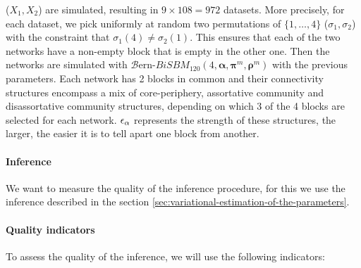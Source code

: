 (\(X_1, X_2\)) are simulated, resulting in \(9 \times 108 = 972\)
datasets. More precisely, for each dataset, we pick uniformly at random
two permutations of \(\{ 1, \dots , 4 \}\) (\(\sigma_1, \sigma_2\)) with
the constraint that \(\sigma_1(4) \neq \sigma_2(1)\). This ensures that
each of the two networks have a non-empty block that is empty in the
other one. Then the networks are simulated with
\(\mathcal{B}\)ern-\(BiSBM_{120}(4, \bm{\alpha}, \bm{\pi}^m, \bm{\rho}^m)\)
with the previous parameters. Each network has 2 blocks in common and
their connectivity structures encompass a mix of core-periphery,
assortative community and disassortative community structures, depending
on which 3 of the 4 blocks are selected for each network.
\(\eps[\alpha]\) represents the strength of these structures, the
larger, the easier it is to tell apart one block from another.

\paragraph{Inference}

We want to measure the quality of the inference procedure, for this we
use the inference described in the section
\ref{sec:variational-estimation-of-the-parameters}.

\paragraph{Quality indicators}

To assess the quality of the inference, we will use the following
indicators:

